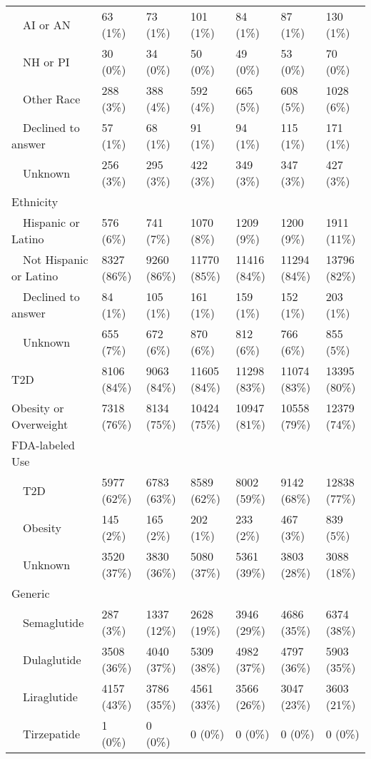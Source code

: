 \begin{longtable}{p{}p{}p{}p{}p{}p{}p{}}
    AI or AN & 63 (1\%) & 73 (1\%) & 101 (1\%) & 84 (1\%) & 87 (1\%) & 130 (1\%) \\ 
    NH or PI & 30 (0\%) & 34 (0\%) & 50 (0\%) & 49 (0\%) & 53 (0\%) & 70 (0\%) \\ 
    Other Race & 288 (3\%) & 388 (4\%) & 592 (4\%) & 665 (5\%) & 608 (5\%) & 1028 (6\%) \\ 
    Declined to answer & 57 (1\%) & 68 (1\%) & 91 (1\%) & 94 (1\%) & 115 (1\%) & 171 (1\%) \\ 
    Unknown & 256 (3\%) & 295 (3\%) & 422 (3\%) & 349 (3\%) & 347 (3\%) & 427 (3\%) \\ 
  Ethnicity &  &  &  &  &  &  \\ 
    Hispanic or Latino & 576 (6\%) & 741 (7\%) & 1070 (8\%) & 1209 (9\%) & 1200 (9\%) & 1911 (11\%) \\ 
    Not Hispanic or Latino & 8327 (86\%) & 9260 (86\%) & 11770 (85\%) & 11416 (84\%) & 11294 (84\%) & 13796 (82\%) \\ 
    Declined to answer & 84 (1\%) & 105 (1\%) & 161 (1\%) & 159 (1\%) & 152 (1\%) & 203 (1\%) \\ 
    Unknown & 655 (7\%) & 672 (6\%) & 870 (6\%) & 812 (6\%) & 766 (6\%) & 855 (5\%) \\ 
  T2D & 8106 (84\%) & 9063 (84\%) & 11605 (84\%) & 11298 (83\%) & 11074 (83\%) & 13395 (80\%) \\ 
  Obesity or Overweight & 7318 (76\%) & 8134 (75\%) & 10424 (75\%) & 10947 (81\%) & 10558 (79\%) & 12379 (74\%) \\ 
  FDA-labeled Use &  &  &  &  &  &  \\ 
    T2D & 5977 (62\%) & 6783 (63\%) & 8589 (62\%) & 8002 (59\%) & 9142 (68\%) & 12838 (77\%) \\ 
    Obesity & 145 (2\%) & 165 (2\%) & 202 (1\%) & 233 (2\%) & 467 (3\%) & 839 (5\%) \\ 
    Unknown & 3520 (37\%) & 3830 (36\%) & 5080 (37\%) & 5361 (39\%) & 3803 (28\%) & 3088 (18\%) \\ 
  Generic &  &  &  &  &  &  \\ 
    Semaglutide & 287 (3\%) & 1337 (12\%) & 2628 (19\%) & 3946 (29\%) & 4686 (35\%) & 6374 (38\%) \\ 
    Dulaglutide & 3508 (36\%) & 4040 (37\%) & 5309 (38\%) & 4982 (37\%) & 4797 (36\%) & 5903 (35\%) \\ 
    Liraglutide & 4157 (43\%) & 3786 (35\%) & 4561 (33\%) & 3566 (26\%) & 3047 (23\%) & 3603 (21\%) \\ 
    Tirzepatide & 1 (0\%) & 0 (0\%) & 0 (0\%) & 0 (0\%) & 0 (0\%) & 0 (0\%) \\ 

\end{longtable}
